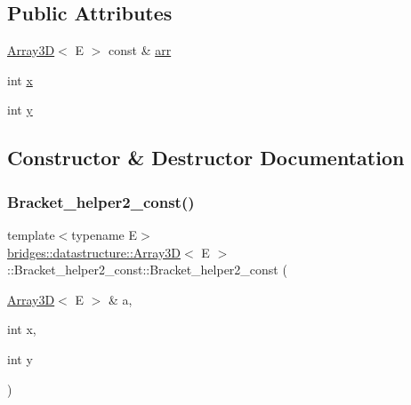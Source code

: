 \subsection*{Public Attributes}
\begin{DoxyCompactItemize}
\item 
\hyperlink{classbridges_1_1datastructure_1_1_array3_d}{Array3D}$<$ E $>$ const  \& \hyperlink{structbridges_1_1datastructure_1_1_array3_d_1_1_bracket__helper2__const_a61e67ef891a27c8c45dd7f0c60dfdad4}{arr}
\item 
int \hyperlink{structbridges_1_1datastructure_1_1_array3_d_1_1_bracket__helper2__const_af71fd602aef4eac98d6ffe3f13f42dd8}{x}
\item 
int \hyperlink{structbridges_1_1datastructure_1_1_array3_d_1_1_bracket__helper2__const_a5c76d396209c5060f72c321d2b70e707}{y}
\end{DoxyCompactItemize}


\subsection{Constructor \& Destructor Documentation}
\mbox{\label{structbridges_1_1datastructure_1_1_array3_d_1_1_bracket__helper2__const_a30128c8c2025bb03325b2c91020dabc5}} 
\subsubsection{\texorpdfstring{Bracket\+\_\+helper2\+\_\+const()}{Bracket\_helper2\_const()}}
{\footnotesize\ttfamily template$<$typename E$>$ \\
\hyperlink{classbridges_1_1datastructure_1_1_array3_d}{bridges\+::datastructure\+::\+Array3D}$<$ E $>$\+::Bracket\+\_\+helper2\+\_\+const\+::\+Bracket\+\_\+helper2\+\_\+const (\begin{DoxyParamCaption}\item[{\hyperlink{classbridges_1_1datastructure_1_1_array3_d}{Array3D}$<$ E $>$ \&}]{a,  }\item[{int}]{x,  }\item[{int}]{y }\end{DoxyParamCaption})\hspace{0.3cm}{\ttfamily [inline]}}



